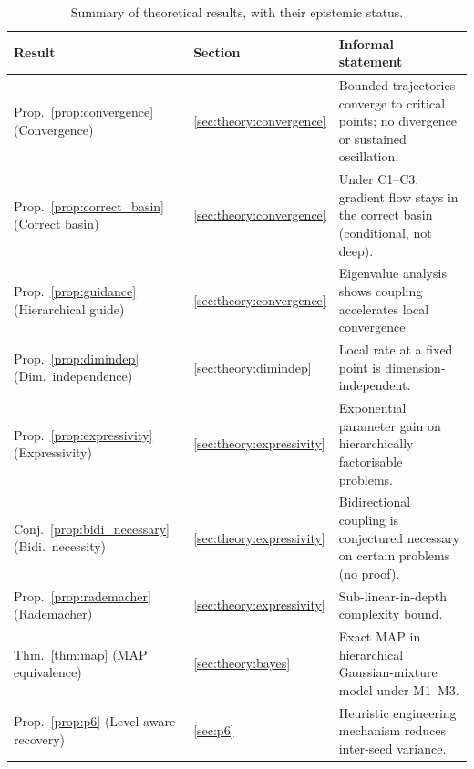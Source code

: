 \documentclass[11pt,a4paper]{article}
\begin{document}
\begin{table}[h]
\centering
\begin{tabular}{llp{6.5cm}}
\toprule
\textbf{Result} & \textbf{Section} & \textbf{Informal statement} \\
\midrule
Prop.~\ref{prop:convergence} (Convergence)        & \ref{sec:theory:convergence} & Bounded trajectories converge to critical points; no divergence or sustained oscillation. \\
Prop.~\ref{prop:correct_basin} (Correct basin)    & \ref{sec:theory:convergence} & Under C1--C3, gradient flow stays in the correct basin (conditional, not deep). \\
Prop.~\ref{prop:guidance} (Hierarchical guide)    & \ref{sec:theory:convergence} & Eigenvalue analysis shows coupling accelerates local convergence. \\
Prop.~\ref{prop:dimindep} (Dim.\ independence)    & \ref{sec:theory:dimindep}    & Local rate at a fixed point is dimension-independent. \\
Prop.~\ref{prop:expressivity} (Expressivity)      & \ref{sec:theory:expressivity} & Exponential parameter gain on hierarchically factorisable problems. \\
Conj.~\ref{prop:bidi_necessary} (Bidi.\ necessity) & \ref{sec:theory:expressivity} & Bidirectional coupling is conjectured necessary on certain problems (no proof). \\
Prop.~\ref{prop:rademacher} (Rademacher)          & \ref{sec:theory:expressivity} & Sub-linear-in-depth complexity bound. \\
Thm.~\ref{thm:map} (MAP equivalence)              & \ref{sec:theory:bayes}       & Exact MAP in hierarchical Gaussian-mixture model under M1--M3. \\
Prop.~\ref{prop:p6} (Level-aware recovery)         & \ref{sec:p6}                 & Heuristic engineering mechanism reduces inter-seed variance. \\
\bottomrule
\end{tabular}
\caption{Summary of theoretical results, with their epistemic status.}
\end{table}
\end{document}
